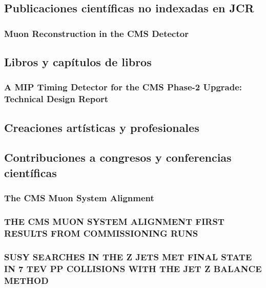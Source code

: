 \documentclass[a4paper, 11pt, twoside, openright]{report}
\begin{document}
\subsection{Publicaciones científicas no indexadas en JCR}

\subsubsection{Muon Reconstruction in the CMS Detector}


\subsection{Libros y capítulos de libros}
\subsubsection{A MIP Timing Detector for the CMS Phase-2 Upgrade: Technical Design Report}



\subsection{Creaciones artísticas y profesionales}

\subsection{Contribuciones a congresos y conferencias científicas}

\subsubsection{The CMS Muon System Alignment}

\subsubsection{THE CMS MUON SYSTEM ALIGNMENT FIRST RESULTS FROM COMMISSIONING RUNS}

\subsubsection{SUSY SEARCHES IN THE Z JETS MET FINAL STATE IN 7 TEV PP COLLISIONS WITH THE JET Z BALANCE METHOD}

\end{document}

